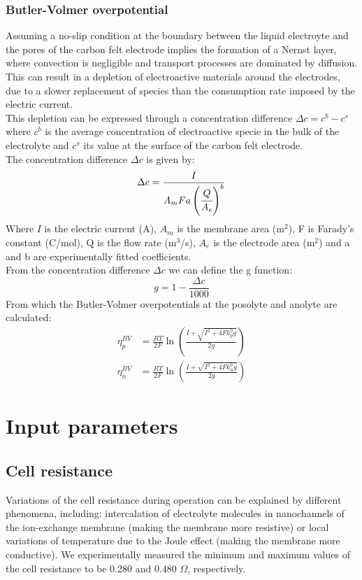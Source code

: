 \documentclass[a4paper,12pt]{article} %
\begin{document}
\subsubsection{Butler-Volmer overpotential}
Assuming a no-slip condition at the boundary between the liquid electroyte and the pores of the carbon felt electrode implies the formation of a Nernst layer, where convection is negligible and transport processes are dominated by diffusion. This can result in a depletion of electroactive materials around the electrodes, due to a slower replacement of species than the consumption rate imposed by the electric current. \\
This depletion can be expressed through a concentration difference $\Delta c = c^b - c^s$  where $c^b$ is the average concentration of electroactive specie in the bulk of the electrolyte and $c^s$ its value at the surface of the carbon felt electrode.\\
The concentration difference $\Delta c$ is given by:
\begin{equation}
    \Delta c = \frac{I}{A_m Fa\left(\cfrac{Q}{A_e}\right)^b}
\end{equation}
Where $I$ is the electric current (A), $A_m$ is the membrane area (m$^2$), F is Farady's constant (C/mol), Q is the flow rate (m$^3$/s), $A_e$ is the electrode area (m$^2$) and a and b are experimentally fitted coefficients.\\
From the concentration difference $\Delta c$ we can define the g function:
\begin{equation}
    g = 1- \frac{\Delta c}{1000}
\end{equation}
From which the Butler-Volmer overpotentials at the posolyte and anolyte are calculated:
\begin{align}
    \eta_p^{BV} &= \frac{RT}{2F} \ln \left( \frac{I + \sqrt{I^2 + 4F k_p^0 g} }{2g} \right) \\
     \eta_n^{BV} &= \frac{RT}{2F} \ln \left( \frac{I + \sqrt{I^2 + 4F k_n^0 g} }{2g} \right) 
\end{align}

\newpage
\section{Input parameters}

\subsection{Cell resistance}
Variations of the cell resistance during operation can be explained by different phenomena, including: intercalation of electrolyte molecules in nanochannels of the ion-exchange membrane (making the membrane more resistive) or local variations of temperature due to the Joule effect (making the membrane more conductive). We experimentally measured the minimum and maximum values of the cell resistance to be 0.280 and 0.480 $\Omega$, respectively.
\end{document}
